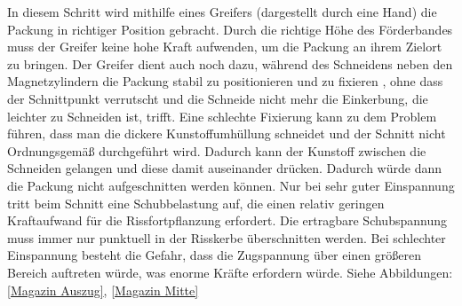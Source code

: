In diesem Schritt wird mithilfe eines Greifers (dargestellt durch eine Hand) die Packung in richtiger Position gebracht.
Durch die richtige Höhe des Förderbandes muss der Greifer keine hohe Kraft aufwenden, um die Packung an ihrem Zielort zu bringen. Der Greifer dient auch noch dazu, während des Schneidens neben den Magnetzylindern die Packung stabil zu positionieren und zu fixieren , ohne dass der Schnittpunkt verrutscht und die Schneide nicht mehr die Einkerbung, die leichter zu Schneiden ist, trifft. Eine schlechte Fixierung kann zu dem Problem führen, dass man die dickere Kunstoffumhüllung schneidet und der Schnitt nicht Ordnungsgemäß durchgeführt wird. Dadurch kann der Kunstoff zwischen die Schneiden gelangen und diese damit auseinander drücken. Dadurch würde dann die Packung nicht aufgeschnitten werden können. Nur bei sehr guter Einspannung tritt beim Schnitt eine Schubbelastung auf, die einen relativ geringen Kraftaufwand für die Rissfortpflanzung erfordert. Die ertragbare Schubspannung muss immer nur punktuell in der Risskerbe überschnitten werden. Bei schlechter Einspannung besteht die Gefahr, dass die Zugspannung über einen größeren Bereich auftreten würde, was enorme Kräfte erfordern würde. Siehe Abbildungen: \ref{Magazin Auszug}, \ref{Magazin Mitte}

